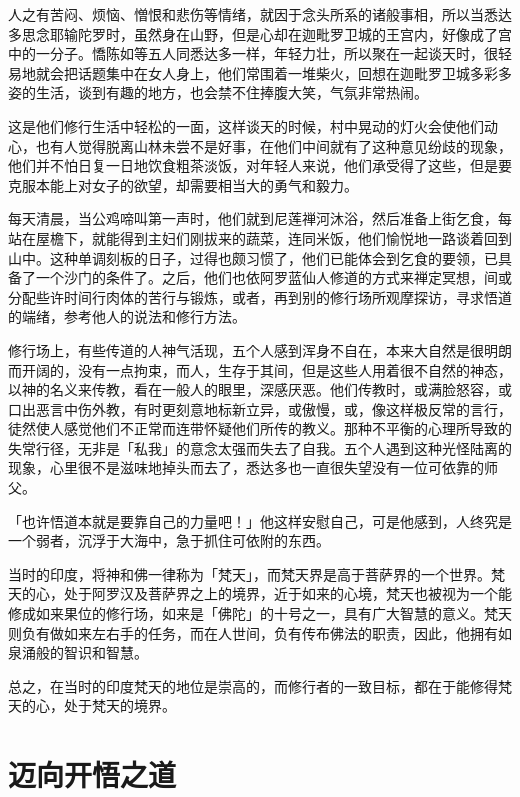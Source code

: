 \documentclass[12pt,twoside,openany]{book}
\begin{document}
人之有苦闷、烦恼、憎恨和悲伤等情绪，就因于念头所系的诸般事相，所以当悉达多思念耶输陀罗时，虽然身在山野，但是心却在迦毗罗卫城的王宫内，好像成了宫中的一分子。憍陈如等五人同悉达多一样，年轻力壮，所以聚在一起谈天时，很轻易地就会把话题集中在女人身上，他们常围着一堆柴火，回想在迦毗罗卫城多彩多姿的生活，谈到有趣的地方，也会禁不住捧腹大笑，气氛非常热闹。

这是他们修行生活中轻松的一面，这样谈天的时候，村中晃动的灯火会使他们动心，也有人觉得脱离山林未尝不是好事，在他们中间就有了这种意见纷歧的现象，他们并不怕日复一日地饮食粗茶淡饭，对年轻人来说，他们承受得了这些，但是要克服本能上对女子的欲望，却需要相当大的勇气和毅力。

每天清晨，当公鸡啼叫第一声时，他们就到尼莲禅河沐浴，然后准备上街乞食，每站在屋檐下，就能得到主妇们刚拔来的蔬菜，连同米饭，他们愉悦地一路谈着回到山中。这种单调刻板的日子，过得也颇习惯了，他们已能体会到乞食的要领，已具备了一个沙门的条件了。之后，他们也依阿罗蓝仙人修道的方式来禅定冥想，间或分配些许时间行肉体的苦行与锻炼，或者，再到别的修行场所观摩探访，寻求悟道的端绪，参考他人的说法和修行方法。

修行场上，有些传道的人神气活现，五个人感到浑身不自在，本来大自然是很明朗而开阔的，没有一点拘束，而人，生存于其间，但是这些人用着很不自然的神态，以神的名义来传教，看在一般人的眼里，深感厌恶。他们传教时，或满脸怒容，或口出恶言中伤外教，有时更刻意地标新立异，或傲慢，或，像这样极反常的言行，徒然使人感觉他们不正常而连带怀疑他们所传的教义。那种不平衡的心理所导致的失常行径，无非是「私我」的意念太强而失去了自我。五个人遇到这种光怪陆离的现象，心里很不是滋味地掉头而去了，悉达多也一直很失望没有一位可依靠的师父。

「也许悟道本就是要靠自己的力量吧！」他这样安慰自己，可是他感到，人终究是一个弱者，沉浮于大海中，急于抓住可依附的东西。

当时的印度，将神和佛一律称为「梵天」，而梵天界是高于菩萨界的一个世界。梵天的心，处于阿罗汉及菩萨界之上的境界，近于如来的心境，梵天也被视为一个能修成如来果位的修行场，如来是「佛陀」的十号之一，具有广大智慧的意义。梵天则负有做如来左右手的任务，而在人世间，负有传布佛法的职责，因此，他拥有如泉涌般的智识和智慧。

总之，在当时的印度梵天的地位是崇高的，而修行者的一致目标，都在于能修得梵天的心，处于梵天的境界。

\section{迈向开悟之道}\label{sec1.8}
\end{document}
